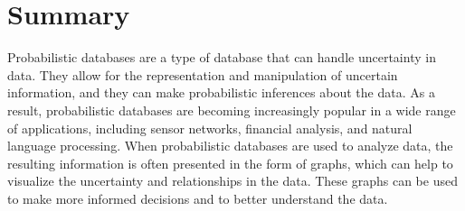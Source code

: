\chapter{Summary}

Probabilistic databases are a type of database that can handle uncertainty in data. They allow for the representation and manipulation of uncertain information, and they can make probabilistic inferences about the data. As a result, probabilistic databases are becoming increasingly popular in a wide range of applications, including sensor networks, financial analysis, and natural language processing. When probabilistic databases are used to analyze data, the resulting information is often presented in the form of graphs, which can help to visualize the uncertainty and relationships in the data. These graphs can be used to make more informed decisions and to better understand the data.